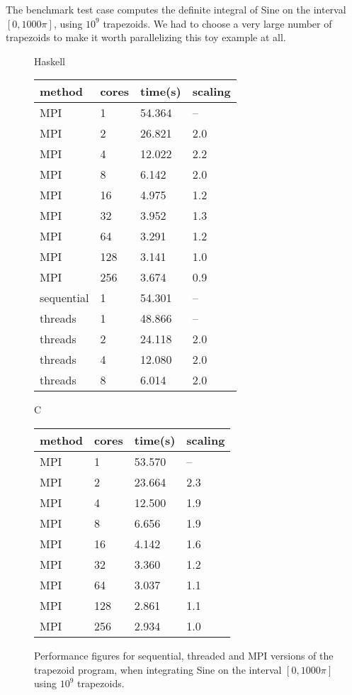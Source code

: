 \documentclass{tmr}
\begin{document}
The benchmark test case computes the definite integral of Sine
on the interval $[0,1000\pi]$, using $10^9$ trapezoids.
We had to choose a very large number of trapezoids to
make it worth parallelizing this toy example at all.

\begin{figure}
\begin{minipage}[t]{0.5\linewidth}\centering
Haskell \\[3mm]
\begin{tabular}{|l|l|l|l|} \hline
method & cores & time(s) & scaling \\ \hline\hline
MPI & 1   & 54.364  & -- \\ \hline
MPI & 2   & 26.821  & 2.0 \\ \hline
MPI & 4   & 12.022  & 2.2 \\ \hline
MPI & 8   & 6.142   & 2.0 \\ \hline
MPI & 16  & 4.975   & 1.2 \\ \hline
MPI & 32  & 3.952   & 1.3 \\ \hline
MPI & 64  & 3.291   & 1.2 \\ \hline
MPI & 128 & 3.141   & 1.0 \\ \hline
MPI & 256 & 3.674   & 0.9 \\ \hline\hline
sequential & 1     & 54.301  & --  \\ \hline\hline
threads & 1    & 48.866  & -- \\ \hline
threads & 2    & 24.118  & 2.0 \\ \hline
threads & 4    & 12.080  & 2.0 \\ \hline
threads & 8    & 6.014  &  2.0 \\ \hline
\end{tabular}
\end{minipage}
\begin{minipage}[t]{0.5\linewidth}
\centering
C \\[3mm]
\begin{tabular}{|l|l|l|l|} \hline
method & cores & time(s) & scaling \\ \hline\hline
MPI & 1      & 53.570  & -- \\ \hline
MPI & 2      & 23.664  & 2.3 \\ \hline
MPI & 4      & 12.500  & 1.9 \\ \hline
MPI & 8      &  6.656  & 1.9 \\ \hline
MPI & 16     &  4.142  & 1.6 \\ \hline
MPI & 32     &  3.360  & 1.2 \\ \hline
MPI & 64     &  3.037  & 1.1 \\ \hline
MPI & 128    &  2.861  & 1.1 \\ \hline
MPI & 256    &  2.934  & 1.0 \\ \hline
\end{tabular}
\end{minipage}
\vspace{3mm}
\caption{Performance figures for sequential, threaded and MPI versions of the trapezoid program,
when integrating Sine on the interval $[0,1000 \pi]$ using $10^9$ trapezoids. \label{TiminigTable}}
\end{figure}
\end{document}
